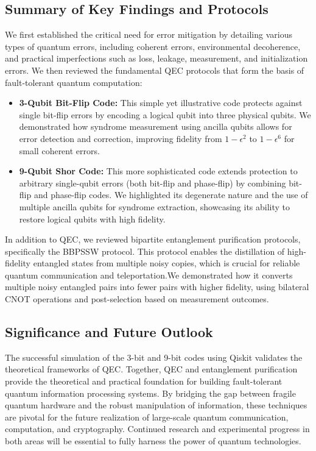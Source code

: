 \documentclass[conference]{IEEEtran}
\begin{document}
\subsection{Summary of Key Findings and Protocols}
We first established the critical need for error mitigation by detailing various types of quantum errors, including coherent errors, environmental decoherence, and practical imperfections such as loss, leakage, measurement, and initialization errors. We then reviewed the fundamental QEC protocols that form the basis of fault-tolerant quantum computation:
\begin{itemize}
    \item \textbf{3-Qubit Bit-Flip Code:} This simple yet illustrative code protects against single bit-flip errors by encoding a logical qubit into three physical qubits. We demonstrated how syndrome measurement using ancilla qubits allows for error detection and correction, improving fidelity from $1-\epsilon^2$ to $1-\epsilon^6$ for small coherent errors.
    \item \textbf{9-Qubit Shor Code:} This more sophisticated code extends protection to arbitrary single-qubit errors (both bit-flip and phase-flip) by combining bit-flip and phase-flip codes. We highlighted its degenerate nature and the use of multiple ancilla qubits for syndrome extraction, showcasing its ability to restore logical qubits with high fidelity.
\end{itemize}
In addition to QEC, we reviewed bipartite entanglement purification protocols, specifically the BBPSSW protocol. This protocol enables the distillation of high-fidelity entangled states from multiple noisy copies, which is crucial for reliable quantum communication and teleportation.We demonstrated how it converts multiple noisy entangled pairs into fewer pairs with higher fidelity, using bilateral CNOT operations and post-selection based on measurement outcomes.

\subsection{Significance and Future Outlook}
The successful simulation of the 3-bit and 9-bit codes using Qiskit validates the theoretical frameworks of QEC. Together, QEC and entanglement purification provide the theoretical and practical foundation for building fault-tolerant quantum information processing systems. By bridging the gap between fragile quantum hardware and the robust manipulation of information, these techniques are pivotal for the future realization of large-scale quantum communication, computation, and cryptography. Continued research and experimental progress in both areas will be essential to fully harness the power of quantum technologies.


\end{document}
